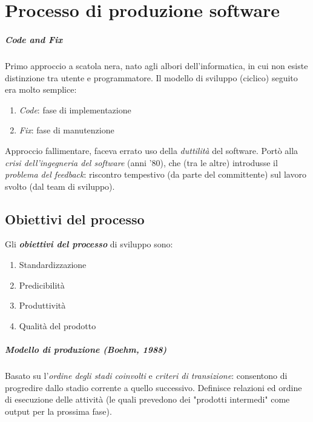 \chapter{Processo di produzione software}

\paragraph{Code and Fix} Primo approccio a scatola nera, nato agli albori dell'informatica, in cui non esiste distinzione tra utente e programmatore.
Il modello di sviluppo (ciclico) seguito era molto semplice:
\begin{enumerate}
    \item \textit{Code}: fase di implementazione
    \item \textit{Fix}: fase di manutenzione
\end{enumerate}
Approccio fallimentare, faceva errato uso della \textit{duttilità} del software. Portò alla \textit{crisi dell'ingegneria del software} (anni '80), che (tra le altre) introdusse il \textit{problema del feedback}: riscontro tempestivo (da parte del committente) sul lavoro svolto (dal team di sviluppo).

\section{Obiettivi del processo}

Gli \textbf{\textit{obiettivi del processo}} di sviluppo sono:
\begin{enumerate}
    \item Standardizzazione
    \item Predicibilità
    \item Produttività
    \item Qualità del prodotto
\end{enumerate}

\paragraph{Modello di produzione (\textit{Boehm, 1988})} Basato su l'\textit{ordine degli stadi coinvolti} e \textit{criteri di transizione}: consentono di progredire dallo stadio corrente a quello successivo. Definisce relazioni ed ordine di esecuzione delle attività (le quali prevedono dei "prodotti intermedi" come output per la prossima fase).

